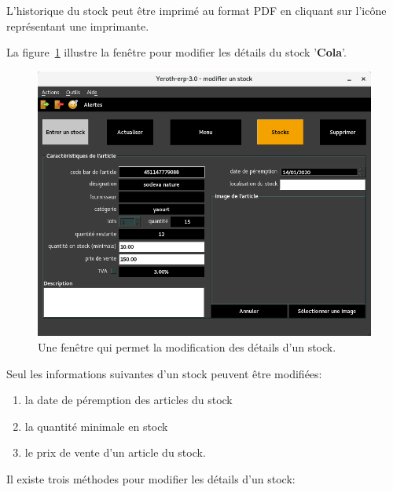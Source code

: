 L'historique du stock peut \^etre imprim\'e
au format PDF en cliquant sur l'ic\^one
repr\'esentant une imprimante.


\newpage
{}

La figure~\ref{fig:yeren-fenetre-modifier-stock}
illustre la fen\^etre pour modifier les d\'etails
du stock '\textbf{Cola}'.\\

\begin{figure}[!htbp]
	\centering
	\includegraphics[scale=0.63]{images/yeren-fenetre-modifier-stock.png}
	\caption{Une fen\^etre qui permet la modification des d\'etails d'un stock.}
	\label{fig:yeren-fenetre-modifier-stock}
\end{figure}

Seul les informations suivantes d'un stock peuvent
\^etre modifi\'ees:
\begin{enumerate}[1)]
	\item la date de p\'eremption des articles du stock
	\item la quantit\'e minimale en stock
	\item le prix de vente d'un article du stock.\\
\end{enumerate}

Il existe trois m\'ethodes pour modifier les d\'etails
d'un stock:

